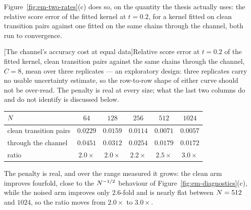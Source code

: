 Figure~\ref{fig:em-two-rates}(c) does so, on the quantity the thesis actually
uses: the relative score error of the fitted kernel at $t = 0.2$, for a kernel
fitted on clean transition pairs against one fitted on the same chains through
the channel, both run to convergence.

\begin{center}
\begin{minipage}{\linewidth}\centering
{}[The channel's accuracy cost at equal data]{Relative score
error at $t = 0.2$ of the fitted kernel, clean transition pairs against the
same chains through the channel, $C = 8$, mean over three replicates --- an
exploratory design: three replicates carry no usable uncertainty estimate, so
the row-to-row shape of either curve should not be over-read. The
penalty is real at every size; what the last two columns do and do not
identify is discussed below.}
\label{tab:em-channel-cost}
\small
\begin{tabular}{@{}lccccc@{}}
\toprule
$N$ & $64$ & $128$ & $256$ & $512$ & $1024$ \\
\midrule
clean transition pairs & $0.0229$ & $0.0159$ & $0.0114$ & $0.0071$ & $0.0057$ \\
through the channel    & $0.0451$ & $0.0312$ & $0.0254$ & $0.0179$ & $0.0172$ \\
\midrule
ratio                  & $2.0\times$ & $2.0\times$ & $2.2\times$ & $2.5\times$ & $3.0\times$ \\
\bottomrule
\end{tabular}
\end{minipage}
\end{center}

The penalty is real, and over the range measured it grows: the
clean arm improves fourfold, close to the $N^{-1/2}$ behaviour of
Figure~\ref{fig:em-diagnostics}(c), while the noised arm improves only
$2.6$-fold and is nearly flat between $N = 512$ and $1024$, so the ratio
moves from $2.0\times$ to $3.0\times$.

